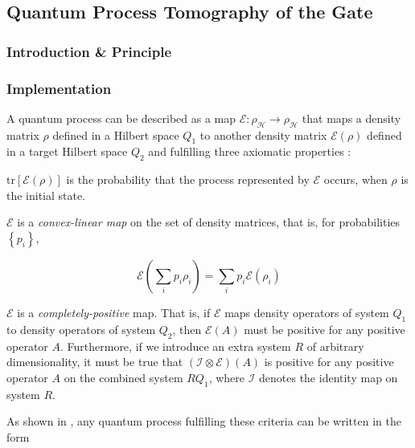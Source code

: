 \subsection{Quantum Process Tomography of the Gate}

\subsubsection{Introduction \& Principle}

\subsubsection{Implementation}

A quantum process can be described as a map $\mathcal{E} : \rho_\mathcal{H} \to \rho_\mathcal{H}$ that maps a density matrix $\rho$ defined in a Hilbert space $Q_1$ to another density matrix $\mathcal{E}(\rho)$ defined in a target Hilbert space $Q_2$ and fulfilling three axiomatic properties \cite{michael_a._nielsen_quantum_2000,haroche_exploring_2006}:

\begin{axiom}
$\mathrm{tr}\left[\mathcal{E}(\rho)\right]$ is the probability that the process represented by $\mathcal{E}$ occurs, when $\rho$ is the initial state.
\end{axiom}

\begin{axiom}
$\mathcal{E}$ is a {\it convex-linear map} on the set of density matrices, that is, for probabilities $\left\{p_i\right\}$,

  \begin{equation}
	  \mathcal{E}\left(\sum\limits_i p_i \rho_i\right) = \sum\limits_i p_i \mathcal{E}(\rho_i)
	\end{equation}
\end{axiom}

\begin{axiom}
$\mathcal{E}$ is a {\it completely-positive} map. That is, if $\mathcal{E}$  maps density operators of system $Q_1$ to density operators of system $Q_2$, then $\mathcal{E}(A)$ must be positive for any positive operator $A$. Furthermore, if we introduce an extra system $R$ of arbitrary dimensionality, it must be true that $(\mathcal{I}\otimes \mathcal{E})(A)$ is positive for any positive operator $A$ on the combined system $RQ_1$, where $\mathcal{I}$ denotes the identity map on system $R$.
\end{axiom}
As shown in \cite{michael_a._nielsen_quantum_2000}, any quantum process fulfilling these criteria can be written in the form

